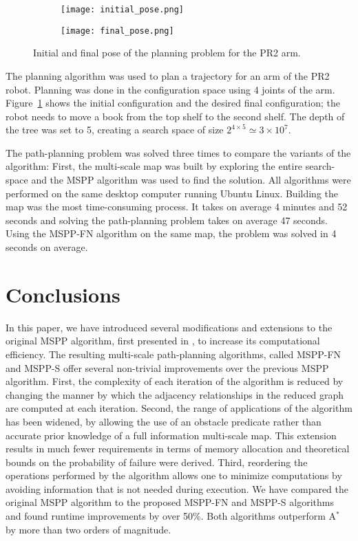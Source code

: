 \documentclass[letterpaper, 10 pt, conference]{ieeeconf}
\theoremstyle{definition}
\begin{document}
\begin{figure}[ht]
\centering
\begin{subfigure}{0.45\linewidth}
\texttt{[image: initial\_pose.png]}
\end{subfigure}\hspace*{2ex}
\begin{subfigure}{0.45\linewidth}
\texttt{[image: final\_pose.png]}
\end{subfigure}
\caption{Initial and final pose of the planning problem for the PR2 arm.}
\label{pr2}
\end{figure}

The planning algorithm was used to plan a trajectory for an arm of the PR2 robot. Planning was done in the configuration space using 4 joints of the arm. Figure~\ref{pr2} shows the initial configuration and the desired final configuration; the robot needs to move a book from the top shelf to the second shelf. The depth of the tree was set to 5, creating a search space of size $2^{4\times 5}\simeq 3\times 10^7$.

The path-planning problem was solved three times to compare the variants of the algorithm: First, the multi-scale map was built by exploring the entire search-space and the MSPP algorithm was used to find the solution.
All algorithms were performed on the same desktop computer running Ubuntu Linux.
Building the map was the most time-consuming process. 
It takes on average 4 minutes and 52 seconds and solving the path-planning problem takes on average 47 seconds.
Using the MSPP-FN algorithm on the same map, the problem was solved in 4 seconds on average.


\section{Conclusions}

In this paper, we have introduced several modifications and extensions to the original MSPP algorithm, first presented in \cite{hauer2015multi}, to increase its computational efficiency.
The resulting multi-scale path-planning algorithms, called MSPP-FN and MSPP-S offer several non-trivial improvements over the previous MSPP algorithm.
First, the complexity of each iteration of the algorithm is reduced by changing the manner by which the adjacency relationships in the reduced graph are computed at each iteration.
Second, the range of applications of the algorithm has been widened,
by allowing the use of an obstacle predicate rather than accurate prior knowledge of a full information multi-scale map.
This extension results in much fewer requirements in terms of memory allocation and theoretical bounds on the probability of failure were derived.
Third, reordering the operations performed by the algorithm allows one to minimize computations by avoiding
information that is not needed during execution.
We have compared the original MSPP algorithm to the proposed MSPP-FN and MSPP-S algorithms and found runtime improvements by over 50\%.
Both algorithms outperform A$^*$ by more than two orders of magnitude.




\end{document}
